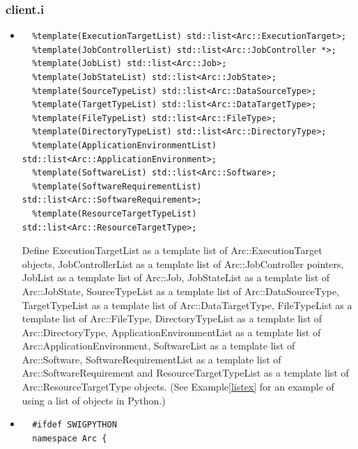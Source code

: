 \documentclass{article}
\begin{document}
\subsubsection{client.i}
\label{iclient}
\begin{flushleft}
\begin{itemize}
  \item{ \begin{verbatim}
  %template(ExecutionTargetList) std::list<Arc::ExecutionTarget>;
  %template(JobControllerList) std::list<Arc::JobController *>;
  %template(JobList) std::list<Arc::Job>;
  %template(JobStateList) std::list<Arc::JobState>;
  %template(SourceTypeList) std::list<Arc::DataSourceType>;
  %template(TargetTypeList) std::list<Arc::DataTargetType>;
  %template(FileTypeList) std::list<Arc::FileType>;
  %template(DirectoryTypeList) std::list<Arc::DirectoryType>;
  %template(ApplicationEnvironmentList) std::list<Arc::ApplicationEnvironment>;
  %template(SoftwareList) std::list<Arc::Software>;
  %template(SoftwareRequirementList) std::list<Arc::SoftwareRequirement>;
  %template(ResourceTargetTypeList) std::list<Arc::ResourceTargetType>;
  \end{verbatim}
  }
  Define ExecutionTargetList as a template list of Arc::ExecutionTarget objects, 
  JobControllerList as a template list of Arc::JobController pointers, 
  JobList as a template list of Arc::Job, JobStateList as a template list of 
  Arc::JobState, SourceTypeList as a template list of Arc::DataSourceType, 
  TargetTypeList as a template list of Arc::DataTargetType, FileTypeList as a 
  template list of Arc::FileType, DirectoryTypeList as a template list of 
  Arc::DirectoryType, ApplicationEnvironmentList as a template list of 
  Arc::ApplicationEnvironment, SoftwareList as a template list of 
  Arc::Software, SoftwareRequirementList as a template list of 
  Arc::SoftwareRequirement and ResourceTargetTypeList as a template list of 
  Arc::ResourceTargetType objects. \linebreak
  (See Example\ref{listex} for an example of using a list of objects in Python.)
\end{itemize}
\begin{itemize}
  \item{ \begin{verbatim}
  #ifdef SWIGPYTHON
  namespace Arc {


\end{verbatim}}
\end{itemize}
\end{flushleft}
\end{document}
